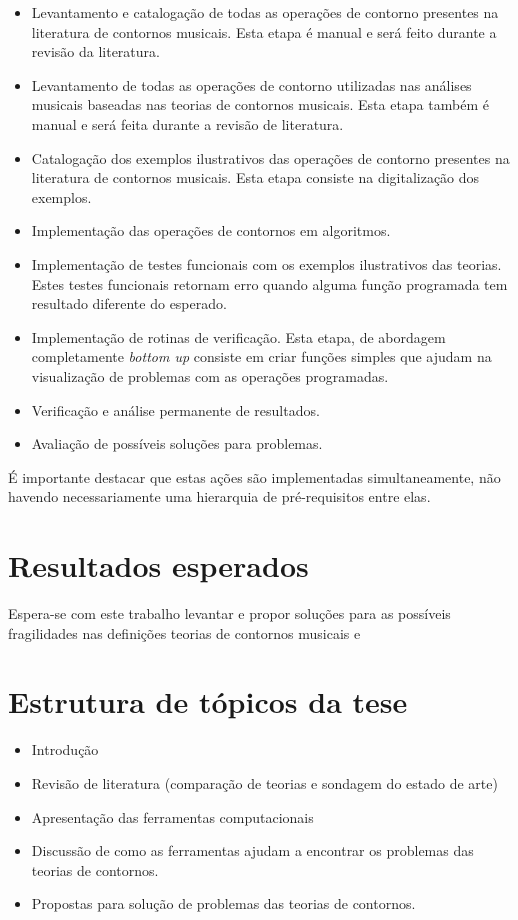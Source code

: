 \documentclass[12pt]{article}
\newcommand{\eng}[1]{\textit{#1}}
\begin{document}
\begin{itemize}
\item Levantamento e catalogação de todas as operações de contorno
  presentes na literatura de contornos musicais. Esta etapa é manual e
  será feito durante a revisão da literatura.
\item Levantamento de todas as operações de contorno utilizadas nas
  análises musicais baseadas nas teorias de contornos musicais. Esta
  etapa também é manual e será feita durante a revisão de literatura.
\item Catalogação dos exemplos ilustrativos das operações de contorno
  presentes na literatura de contornos musicais. Esta etapa consiste
  na digitalização dos exemplos.
\item Implementação das operações de contornos em algoritmos.
\item Implementação de testes funcionais com os exemplos ilustrativos
  das teorias. Estes testes funcionais retornam erro quando alguma
  função programada tem resultado diferente do esperado.
\item Implementação de rotinas de verificação. Esta etapa, de
  abordagem completamente \eng{bottom up} consiste em criar funções
  simples que ajudam na visualização de problemas com as operações
  programadas.
\item Verificação e análise permanente de resultados.
\item Avaliação de possíveis soluções para problemas.
\end{itemize}

É importante destacar que estas ações são implementadas
simultaneamente, não havendo necessariamente uma hierarquia de
pré-requisitos entre elas.

\section{Resultados esperados}
\label{sec:resultados-esperados}

Espera-se com este trabalho levantar e propor soluções para as
possíveis fragilidades nas definições teorias de contornos musicais e

\section{Estrutura de tópicos da tese}
\label{sec:estrutura-de-topicos}

\begin{itemize}
\item Introdução
\item Revisão de literatura (comparação de teorias e sondagem do
  estado de arte)
\item Apresentação das ferramentas computacionais
\item Discussão de como as ferramentas ajudam a encontrar os problemas
  das teorias de contornos.
\item Propostas para solução de problemas das teorias de contornos.
\end{itemize}
\end{document}
